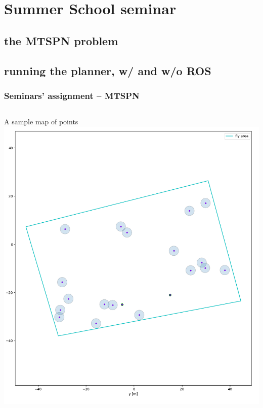 \documentclass[aspectratio=1610]{beamer}
\begin{document}

\section{Summer School seminar}
\subsection{the MTSPN problem}
\subsection{running the planner, w/ and w/o ROS}


\begin{frame}
  \frametitle{Seminars' assignment -- MTSPN}

  \begin{columns}[c]

    \begin{block}{A sample map of points}
      \includegraphics[width=1.0\textwidth]{./fig/tsp_points.png}
    \end{block}


\end{columns}
\end{frame}
\end{document}
